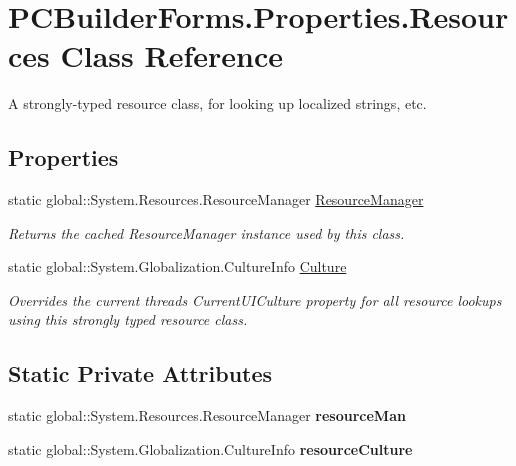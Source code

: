 \hypertarget{class_p_c_builder_forms_1_1_properties_1_1_resources}{}\section{P\+C\+Builder\+Forms.\+Properties.\+Resources Class Reference}
\label{class_p_c_builder_forms_1_1_properties_1_1_resources}


A strongly-\/typed resource class, for looking up localized strings, etc.  


\subsection*{Properties}
\begin{DoxyCompactItemize}
\item 
static global\+::\+System.\+Resources.\+Resource\+Manager \hyperlink{class_p_c_builder_forms_1_1_properties_1_1_resources_ac6548299b72ecf6fdd7e522ea4c49acf}{Resource\+Manager}
\begin{DoxyCompactList}\small\item\em Returns the cached Resource\+Manager instance used by this class. \end{DoxyCompactList}\item 
static global\+::\+System.\+Globalization.\+Culture\+Info \hyperlink{class_p_c_builder_forms_1_1_properties_1_1_resources_a815a910fd4361950f9ebd6fcf6209cc8}{Culture}
\begin{DoxyCompactList}\small\item\em Overrides the current thread\textquotesingle{}s Current\+U\+I\+Culture property for all resource lookups using this strongly typed resource class. \end{DoxyCompactList}\end{DoxyCompactItemize}
\subsection*{Static Private Attributes}
\begin{DoxyCompactItemize}
\item 
static global\+::\+System.\+Resources.\+Resource\+Manager {\bfseries resource\+Man}\hypertarget{class_p_c_builder_forms_1_1_properties_1_1_resources_ae7b01286aebde33d034035d1aaf42800}{}\label{class_p_c_builder_forms_1_1_properties_1_1_resources_ae7b01286aebde33d034035d1aaf42800}

\item 
static global\+::\+System.\+Globalization.\+Culture\+Info {\bfseries resource\+Culture}\hypertarget{class_p_c_builder_forms_1_1_properties_1_1_resources_af671e11dd336cdd0e0cb6d270fb48704}{}\label{class_p_c_builder_forms_1_1_properties_1_1_resources_af671e11dd336cdd0e0cb6d270fb48704}

\end{DoxyCompactItemize}


